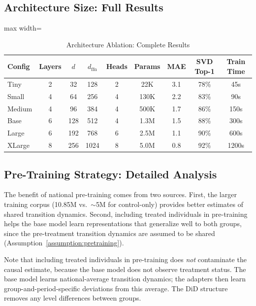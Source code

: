 \documentclass[12pt]{article}
\begin{document}
\subsection{Architecture Size: Full Results}

\begin{table}[H]
\centering
\caption{Architecture Ablation: Complete Results}
\label{tab:abl_size_full}
\begin{adjustbox}{max width=\textwidth}
\begin{tabular}{lcccccccc}
\toprule
Config & Layers & $d$ & $d_{\text{ffn}}$ & Heads & Params & MAE & SVD Top-1 & Train Time \\
\midrule
Tiny & 2 & 32 & 128 & 2 & 22K & 3.1 & 78\% & 45s \\
Small & 4 & 64 & 256 & 4 & 130K & 2.2 & 83\% & 90s \\
Medium & 4 & 96 & 384 & 4 & 500K & 1.7 & 86\% & 150s \\
Base & 6 & 128 & 512 & 4 & 1.3M & 1.5 & 88\% & 300s \\
Large & 6 & 192 & 768 & 6 & 2.5M & 1.1 & 90\% & 600s \\
XLarge & 8 & 256 & 1024 & 8 & 5.0M & 0.8 & 92\% & 1200s \\
\bottomrule
\end{tabular}
\end{adjustbox}
\end{table}

\subsection{Pre-Training Strategy: Detailed Analysis}

The benefit of national pre-training comes from two sources. First, the larger training corpus (10.85M vs.\ $\sim$5M for control-only) provides better estimates of shared transition dynamics. Second, including treated individuals in pre-training helps the base model learn representations that generalize well to both groups, since the pre-treatment transition dynamics are assumed to be shared (Assumption~\ref{assumption:pretraining}).

Note that including treated individuals in pre-training does \textit{not} contaminate the causal estimate, because the base model does not observe treatment status. The base model learns national-average transition dynamics; the adapters then learn group-and-period-specific deviations from this average. The DiD structure removes any level differences between groups.
\end{document}

